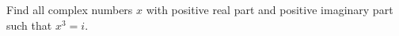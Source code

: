 Find all complex numbers $x$ with positive real part and positive imaginary part such that $x^3=i$.

